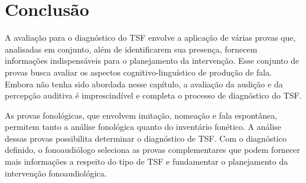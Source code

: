 \documentclass[output=paper,colorlinks,citecolor=brown,booklanguage=portuguese]{langscibook}
\begin{document}
\section{Conclusão}

A avaliação para o diagnóstico do TSF envolve a aplicação de várias provas que, analisadas em conjunto, além de identificarem sua presença, fornecem informações indispensáveis para o planejamento da intervenção. Esse conjunto de provas busca avaliar os aspectos cognitivo-linguístico de produção de fala. Embora não tenha sido abordada nesse capítulo, a avaliação da audição e da percepção auditiva é imprescindível e completa o processo de diagnóstico do TSF.

As provas fonológicas, que envolvem imitação, nomeação e fala espontânea, permitem tanto a análise fonológica quanto do inventário fonético. A análise dessas provas possibilita determinar o diagnóstico de TSF. Com o diagnóstico definido, o fonoaudiólogo seleciona as provas complementares que podem fornecer mais informações a respeito do tipo de TSF e fundamentar o planejamento da intervenção fonoaudiológica. 


{\sloppy\printbibliography[heading=subbibliography,notkeyword=this]}
\end{document}
